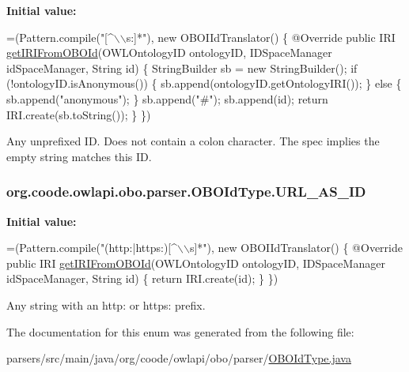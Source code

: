 {\bfseries Initial value\-:}
\begin{DoxyCode}
=(Pattern.compile(\textcolor{stringliteral}{"[^\(\backslash\)\(\backslash\)s:]*"}), \textcolor{keyword}{new} OBOIIdTranslator() \{
        @Override
        \textcolor{keyword}{public} IRI \hyperlink{enumorg_1_1coode_1_1owlapi_1_1obo_1_1parser_1_1_o_b_o_id_type_a20861c514a5d45763ad0e6da65cd04c0}{getIRIFromOBOId}(OWLOntologyID ontologyID, IDSpaceManager idSpaceManager, 
      String \textcolor{keywordtype}{id}) \{
            StringBuilder sb = \textcolor{keyword}{new} StringBuilder();
            \textcolor{keywordflow}{if} (!ontologyID.isAnonymous()) \{
                sb.append(ontologyID.getOntologyIRI());
            \}
            \textcolor{keywordflow}{else} \{
                sb.append(\textcolor{stringliteral}{"anonymous"});
            \}
            sb.append(\textcolor{stringliteral}{"#"});
            sb.append(id);
            \textcolor{keywordflow}{return} IRI.create(sb.toString());
        \}
    \})
\end{DoxyCode}
Any unprefixed I\-D. Does not contain a colon character. The spec implies the empty string matches this I\-D. \hypertarget{enumorg_1_1coode_1_1owlapi_1_1obo_1_1parser_1_1_o_b_o_id_type_aadc8930dd1024a4a5b90c1675bd93e47}{
\subsubsection[{U\-R\-L\-\_\-\-A\-S\-\_\-\-I\-D}]{\setlength{\rightskip}{0pt plus 5cm}org.\-coode.\-owlapi.\-obo.\-parser.\-O\-B\-O\-Id\-Type.\-U\-R\-L\-\_\-\-A\-S\-\_\-\-I\-D}}\label{enumorg_1_1coode_1_1owlapi_1_1obo_1_1parser_1_1_o_b_o_id_type_aadc8930dd1024a4a5b90c1675bd93e47}
{\bfseries Initial value\-:}
\begin{DoxyCode}
=(Pattern.compile(\textcolor{stringliteral}{"(http:|https:)[^\(\backslash\)\(\backslash\)s]*"}), \textcolor{keyword}{new} OBOIIdTranslator() \{
        @Override
        \textcolor{keyword}{public} IRI \hyperlink{enumorg_1_1coode_1_1owlapi_1_1obo_1_1parser_1_1_o_b_o_id_type_a20861c514a5d45763ad0e6da65cd04c0}{getIRIFromOBOId}(OWLOntologyID ontologyID, IDSpaceManager idSpaceManager, 
      String \textcolor{keywordtype}{id}) \{
            \textcolor{keywordflow}{return} IRI.create(id);
        \}
    \})
\end{DoxyCode}
Any string with an http\-: or https\-: prefix. 

The documentation for this enum was generated from the following file\-:\begin{DoxyCompactItemize}
\item 
parsers/src/main/java/org/coode/owlapi/obo/parser/\hyperlink{_o_b_o_id_type_8java}{O\-B\-O\-Id\-Type.\-java}\end{DoxyCompactItemize}
